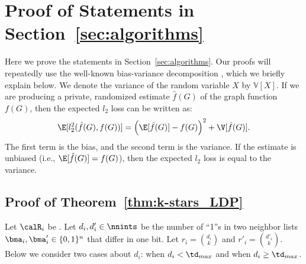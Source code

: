 \appendix


\section{Proof of Statements in Section~\ref{sec:algorithms}}
\label{sec:proof}
Here we prove the statements in Section~\ref{sec:algorithms}. 
Our proofs will repeatedly use the well-known bias-variance decomposition \cite{mlpp}, which we briefly explain below. 
We denote the variance of the random variable $X$ by $\mathbb{V}[X]$. 
If we are producing a private, randomized estimate $\hat{f}(G)$ of the graph function $f(G)$, then the expected $l_2$ loss can be written as: 
\begin{equation}\label{eq:bias-var}
  \E[l_2^2(\hat{f}(G),f(G))] = \left(\E[\hat{f}(G)] - f(G)\right)^2
  + \V[\hat{f}(G)].
\end{equation}
The first term is the bias, and the second term is the variance. 
If the estimate is unbiased (i.e., $\E[\hat{f}(G)] = f(G)$), then the expected $l_2$ loss is equal to the variance.

\subsection{Proof of Theorem~\ref{thm:k-stars_LDP}}
Let $\calR_i$ be . 
Let $d_i,d'_i \in \nnints$ be the number of ``1''s in two neighbor lists $\bma_i,\bma'_i \in \{0,1\}^n$ that differ in one bit. 
Let $r_i = \binom{d_i}{k}$ and $r'_i = \binom{d'_i}{k}$. 
Below we consider two cases about $d_i$: when $d_i < \td_{max}$ and when $d_i \geq \td_{max}$.

